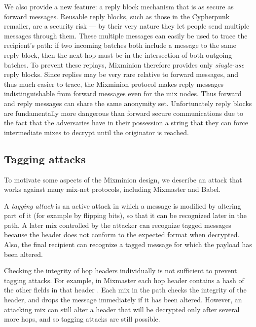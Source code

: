 \documentclass[11pt]{IEEEtran}
\begin{document}
We also provide a new feature: a reply block mechanism that is as secure
as forward messages.
Reusable reply blocks, such as those in the Cypherpunk remailer, are a
security risk --- by their very nature they let people send multiple
messages through them.  These multiple messages can easily be used to
trace the recipient's path: if two incoming batches both include a
message to the same reply block, then the next hop must be in the
intersection of both outgoing batches.  To prevent these replays,
Mixminion therefore provides only \emph{single-use} reply blocks. Since
replies may be very rare relative to forward messages, and thus
much easier to trace, the Mixminion protocol makes reply messages
indistinguishable from forward messages even for the mix nodes. Thus
forward and reply messages can share the same anonymity
set. Unfortunately reply blocks are fundamentally more dangerous than
forward secure communications due to the fact that the adversaries have
in their possession a string that they can force intermediate mixes to
decrypt until the originator is reached.

\subsection{Tagging attacks}
\label{subsec:tagging-attacks}

To motivate some aspects of the Mixminion design, we describe an attack
that works against many mix-net protocols, including Mixmaster and Babel.

A {\em tagging attack} is an active attack in which a message is
modified by altering part of it (for example by flipping bits), so
that it can be recognized later in the path.  A later mix controlled by
the attacker can recognize tagged messages because the header does
not conform to the expected format when decrypted.  Also, the final
recipient can recognize a tagged message for which the payload has
been altered.

Checking the integrity of hop headers individually is not
sufficient to prevent tagging attacks.  For example, in Mixmaster
each hop header contains a hash of the other fields in that header
\cite{mixmaster-spec}.
Each mix in the path checks the integrity of the header, and drops
the message immediately if it has been altered.  However, 
an attacking mix can still alter a header that will be decrypted
only after several more hops, and so tagging attacks are still possible.
\end{document}
